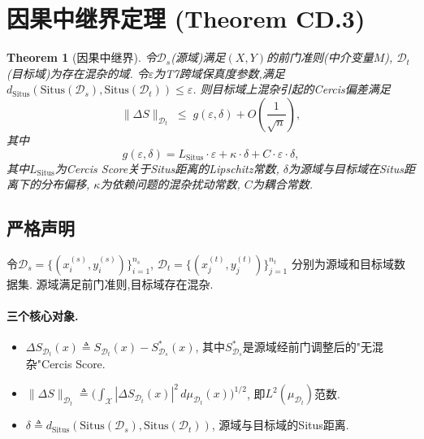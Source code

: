 \documentclass[12pt,a4paper]{article}
\newtheorem{theorem}{Theorem}[section]
\newcommand{\cX}{\mathcal{X}}
\newcommand{\cD}{\mathcal{D}}
\newcommand{\Situs}{\mathrm{Situs}}
\newcommand{\defeq}{\triangleq}
\begin{document}
\section{因果中继界定理 (Theorem CD.3)}
\label{sec:relay}

\begin{theorem}[因果中继界]\label{thm:causal-relay}
    令$\cD_s$(源域)满足$(X,Y)$的前门准则(中介变量$M$),
    $\cD_t$(目标域)为存在混杂的域.
    令$\varepsilon$为T7跨域保真度参数,满足
    $d_{\Situs}(\Situs(\cD_s), \Situs(\cD_t)) \leq \varepsilon$.
    则目标域上混杂引起的Cercis偏差满足
    \begin{equation}\label{eq:relay-bound}
        \|\Delta S\|_{\cD_t} \;\leq\;
        g(\varepsilon, \delta) + O\!\left(\frac{1}{\sqrt{n}}\right),
    \end{equation}
    其中
    \begin{equation}\label{eq:g-function}
        g(\varepsilon, \delta) = L_{\Situs} \cdot \varepsilon
        + \kappa \cdot \delta + C \cdot \varepsilon \cdot \delta,
    \end{equation}
    其中$L_{\Situs}$为Cercis Score关于Situs距离的Lipschitz常数,
    $\delta$为源域与目标域在Situs距离下的分布偏移,
    $\kappa$为依赖问题的混杂扰动常数,
    $C$为耦合常数.
\end{theorem}

\subsection{严格声明}

令$\cD_s = \{(x_i^{(s)}, y_i^{(s)})\}_{i=1}^{n_s}$,
$\cD_t = \{(x_j^{(t)}, y_j^{(t)})\}_{j=1}^{n_t}$
分别为源域和目标域数据集.
源域满足前门准则,目标域存在混杂.

\paragraph{三个核心对象.}
\begin{itemize}
    \item $\Delta S_{\cD_t}(x) \defeq S_{\cD_t}(x) - S_{\cD_s}^*(x)$,
          其中$S_{\cD_s}^*$是源域经前门调整后的"无混杂"Cercis Score.
    \item $\|\Delta S\|_{\cD_t} \defeq \big(\int_{\cX} |\Delta S_{\cD_t}(x)|^2 \, d\mu_{\cD_t}(x)\big)^{1/2}$,
          即$L^2(\mu_{\cD_t})$范数.
    \item $\delta \defeq d_{\Situs}(\Situs(\cD_s), \Situs(\cD_t))$,
          源域与目标域的Situs距离.
\end{itemize}
\end{document}
